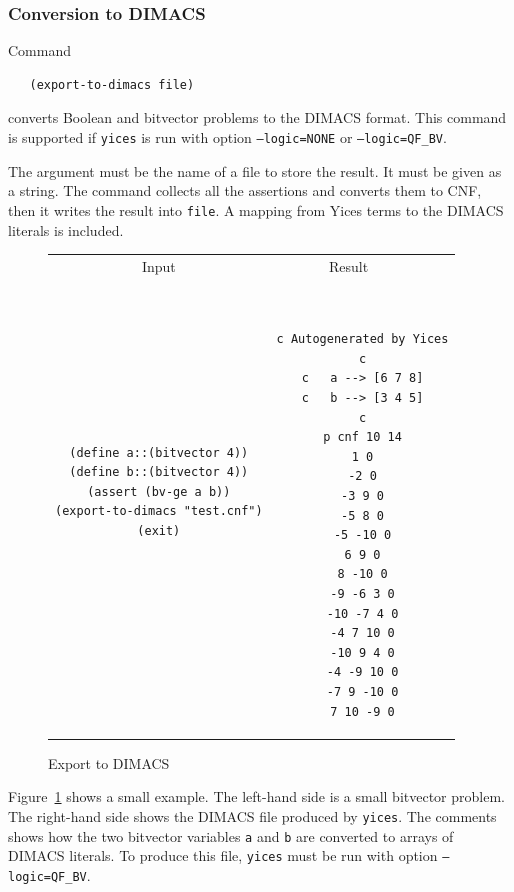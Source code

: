 \documentclass[11pt,twoside,fleqn,openright,titlepage]{cslreport}
\begin{document}
\subsubsection*{Conversion to DIMACS}

Command
\begin{small}
\begin{verbatim}
   (export-to-dimacs file)
\end{verbatim}
\end{small}
converts Boolean and bitvector problems to the DIMACS format. This
command is supported if \texttt{yices} is run with option
\texttt{--logic=NONE} or \texttt{--logic=QF\_BV}.

\medskip\noindent The argument must be the name of a file to store the
result. It must be given as a string. The command collects all the
assertions and converts them to CNF, then it writes the result into
\texttt{file}. A mapping from Yices terms to the DIMACS literals is
included.

\begin{figure}
\begin{footnotesize}
\begin{center}
\begin{tabular}{c|c}
\multicolumn{1}{c}{Input} & \multicolumn{1}{c}{Result~~~~} \\[0.4em]

\begin{minipage}[c]{6.2cm}
\begin{verbatim}
(define a::(bitvector 4))
(define b::(bitvector 4))
(assert (bv-ge a b))
(export-to-dimacs "test.cnf")
(exit)
\end{verbatim}
\end{minipage}~~
&
~~~~\begin{minipage}[c]{6cm}
\begin{verbatim}
c Autogenerated by Yices
c
c   a --> [6 7 8]
c   b --> [3 4 5]
c
p cnf 10 14
1 0
-2 0
-3 9 0
-5 8 0
-5 -10 0
6 9 0
8 -10 0
-9 -6 3 0
-10 -7 4 0
-4 7 10 0
-10 9 4 0
-4 -9 10 0
-7 9 -10 0
7 10 -9 0
\end{verbatim}
\end{minipage}
\end{tabular}
\end{center}
\end{footnotesize}
\caption{Export to DIMACS}
\label{export-example}
\end{figure}

Figure~\ref{export-example} shows a small example. The left-hand side
is a small bitvector problem. The right-hand side shows the DIMACS
file produced by \texttt{yices}. The comments shows how the two
bitvector variables \texttt{a} and \texttt{b} are converted to arrays
of DIMACS literals.  To produce this file, \texttt{yices} must be
run with option \texttt{--logic=QF\_BV}.
\end{document}
